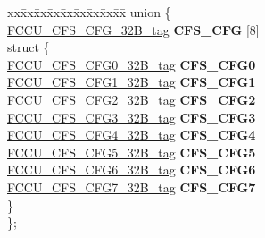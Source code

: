 \begin{DoxyCompactItemize}
\begin{tabbing}
\end{tabbing}\item 
\mbox{\label{structFCCU__struct__tag_aba98c8c87038411954f650c907cfddcf}} 
\begin{tabbing}
xx\=xx\=xx\=xx\=xx\=xx\=xx\=xx\=xx\=\kill
union \{\\
\>\mbox{\hyperlink{unionFCCU__CFS__CFG__32B__tag}{FCCU\_CFS\_CFG\_32B\_tag}} {\bfseries CFS\_CFG} \mbox{[}8\mbox{]}\\
\mbox{\label{unionFCCU__struct__tag_1_1_0D2090_a402b9bc843eee67ec1a02947a9e9a8f9}} 
\>struct \{\\
\>\>\mbox{\hyperlink{unionFCCU__CFS__CFG0__32B__tag}{FCCU\_CFS\_CFG0\_32B\_tag}} {\bfseries CFS\_CFG0}\\
\>\>\mbox{\hyperlink{unionFCCU__CFS__CFG1__32B__tag}{FCCU\_CFS\_CFG1\_32B\_tag}} {\bfseries CFS\_CFG1}\\
\>\>\mbox{\hyperlink{unionFCCU__CFS__CFG2__32B__tag}{FCCU\_CFS\_CFG2\_32B\_tag}} {\bfseries CFS\_CFG2}\\
\>\>\mbox{\hyperlink{unionFCCU__CFS__CFG3__32B__tag}{FCCU\_CFS\_CFG3\_32B\_tag}} {\bfseries CFS\_CFG3}\\
\>\>\mbox{\hyperlink{unionFCCU__CFS__CFG4__32B__tag}{FCCU\_CFS\_CFG4\_32B\_tag}} {\bfseries CFS\_CFG4}\\
\>\>\mbox{\hyperlink{unionFCCU__CFS__CFG5__32B__tag}{FCCU\_CFS\_CFG5\_32B\_tag}} {\bfseries CFS\_CFG5}\\
\>\>\mbox{\hyperlink{unionFCCU__CFS__CFG6__32B__tag}{FCCU\_CFS\_CFG6\_32B\_tag}} {\bfseries CFS\_CFG6}\\
\>\>\mbox{\hyperlink{unionFCCU__CFS__CFG7__32B__tag}{FCCU\_CFS\_CFG7\_32B\_tag}} {\bfseries CFS\_CFG7}\\
\>\} \\
\}; \\


\end{tabbing}
\end{DoxyCompactItemize}
